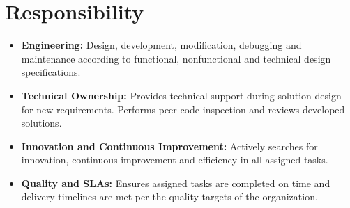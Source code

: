 \documentclass[a4paper,12pt]{article}
\begin{document}
\section{Responsibility}
\begin{itemize}[nosep,after=\strut, leftmargin=1em, itemsep=3pt]
    \item \textbf{Engineering:} Design, development, modification, debugging and maintenance according to functional, non­functional and technical design specifications.
    \item \textbf{Technical Ownership:} Provides technical support during solution design for new requirements. Performs peer code inspection and reviews developed solutions.
    \item \textbf{Innovation and Continuous Improvement:} Actively searches for innovation, continuous improvement and efficiency in all assigned tasks.
    \item \textbf{Quality and SLAs:} Ensures assigned tasks are completed on time and delivery timelines are met per the quality targets of the organization.
\end{itemize}
     
\end{document}
